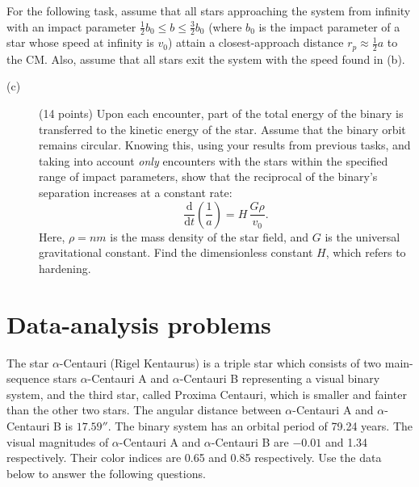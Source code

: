For the following task, assume that all stars approaching the system from
infinity with an impact parameter $\frac{1}{2}b_0 \le b \le \frac{3}{2}b_0$
(where $b_0$ is the impact parameter of a star whose speed at infinity is
$v_0$) attain a closest-approach distance $r_p \approx \frac{1}{2}a$ to the
CM. Also, assume that all stars exit the system with the speed found in (b).

\begin{description}
\item[(c)] (14 points) Upon each encounter, part of the total energy of the
  binary is transferred to the kinetic energy of the star. Assume that the
  binary orbit remains circular. Knowing this, using your results from
  previous tasks, and taking into account \emph{only} encounters with the
  stars within the specified range of impact parameters, show that the
  reciprocal of the binary's separation increases at a constant rate:
  \[ \frac{\mathrm{d}}{\mathrm{d}t}\left(\frac{1}{a}\right)
     = H\,\frac{G\rho}{v_0}. \]
  Here, $\rho = nm$ is the mass density of the star field, and $G$ is the
  universal gravitational constant. Find the dimensionless constant $H$,
  which refers to hardening.
\end{description}

\section*{Data-analysis problems}

The star $\alpha$-Centauri (Rigel Kentaurus) is a triple star which consists
of two main-sequence stars $\alpha$-Centauri A and $\alpha$-Centauri B
representing a visual binary system, and the third star, called Proxima
Centauri, which is smaller and fainter than the other two stars. The angular
distance between $\alpha$-Centauri A and $\alpha$-Centauri B is $17.59''$.
The binary system has an orbital period of 79.24 years. The visual magnitudes
of $\alpha$-Centauri A and $\alpha$-Centauri B are $-0.01$ and 1.34
respectively. Their color indices are 0.65 and 0.85 respectively. Use the
data below to answer the following questions.

